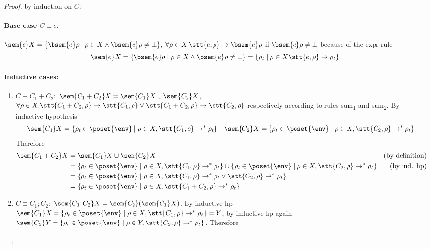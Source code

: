 \begin{proof}
  by induction on \(C\):
  \paragraph*{Base case \(C \equiv e\):\\}
  \(\sem{e}X = \{\bsem{e}\rho \mid \rho \in X \wedge \bsem{e}\rho
  \neq \bot \}\), \(\forall \rho \in X . \stt{e, \rho} \to
  \bsem{e}\rho\) if \(\bsem{e}\rho \neq \bot\) because of the expr
  rule \[\sem{e}X = \{\bsem{e}\rho \mid \rho \in X \wedge
  \bsem{e}\rho \neq \bot \} = \{\rho_t \mid \rho \in X \stt{e, \rho}
  \to \rho_t\}\]
  \paragraph*{Inductive cases:\\}
  \begin{enumerate}
  \item \(C \equiv C_1 + C_2:\) \(\sem{C_1 + C_2}X = \sem{C_1}X \cup
    \sem{C_2}X\), \(\forall \rho \in X . \stt{C_1 + C_2, \rho} \to
    \stt{C_1, \rho} \vee \stt{C_1 + C_2, \rho} \to \stt{C_2, \rho}\)
    respectively according to rules sum\textsubscript{1} and
    sum\textsubscript{2}. By inductive hypothesis \[\sem{C_1}X =
    \{\rho_t \in\poset{\env} \mid \rho \in X , \stt{C_1,\rho} \to^* \rho_t\} \quad
    \sem{C_2}X = \{\rho_t \in\poset{\env} \mid \rho \in X , \stt{C_2,\rho} \to^*
    \rho_t\}\] Therefore
    \begin{align*}
      \sem{C_1 + C_2}X & = \sem{C_1}X \cup \sem{C_2}X & \text{(by definition)}\\
      & = \{\rho_t \in\poset{\env} \mid \rho \in X , \stt{C_1,\rho} \to^* \rho_t\} \cup \{\rho_t \in\poset{\env} \mid \rho \in X , \stt{C_2,\rho} \to^* \rho_t\} & \text{(by ind. hp)}\\
      & = \{\rho_t \in\poset{\env} \mid \rho \in X, \stt{C_1,\rho} \to^* \rho_t \vee \stt{C_2,\rho} \to^* \rho_t\} \\
      & = \{\rho_t \in\poset{\env} \mid \rho \in X, \stt{C_1 + C_2, \rho} \to^* \rho_t\}
    \end{align*}
  \item \(C \equiv C_1;C_2:\) \(\sem{C_1;C_2}X =
    \sem{C_2}(\sem{C_1}X)\). By inductive hp \(\sem{C_1}X = \{\rho_t
    \in\poset{\env} \mid \rho \in X, \stt{C_1, \rho} \to^* \rho_t\} = Y\), by inductive
    hp again \(\sem{C_2}Y = \{\rho_t \in\poset{\env} \mid \rho \in Y, \stt{C_2, \rho}
    \to^* \rho_t\}\). Therefore
    \begin{align*}

\end{align*}
\end{enumerate}
\end{proof}
